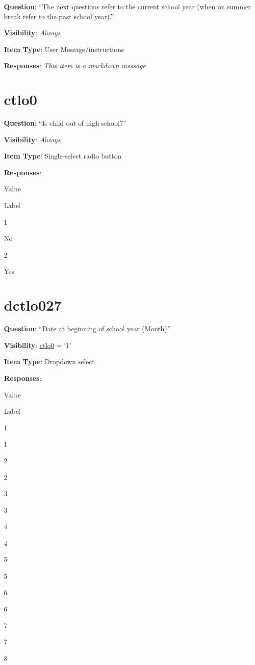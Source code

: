 \documentclass[]{book}
\begin{document}
\textbf{Question}: ``The next questions refer to the current school year (when on summer break refer to the past school year).''

\textbf{Visibility}: \emph{Always}

\textbf{Item Type}: User Message/instructions

\textbf{Responses}: \emph{This item is a markdown message}

\hypertarget{ctlo0}{%
\section{ctlo0}\label{ctlo0}}

\textbf{Question}: ``Is child out of high school?''

\textbf{Visibility}: \emph{Always}

\textbf{Item Type}: Single-select radio button

\textbf{Responses}:

Value

Label

1

No

2

Yes

\hypertarget{dctlo027}{%
\section{dctlo027}\label{dctlo027}}

\textbf{Question}: ``Date at beginning of school year (Month)''

\textbf{Visibility}: \protect\hyperlink{ctlo0}{ctlo0} = `1'

\textbf{Item Type}: Dropdown select

\textbf{Responses}:

Value

Label

1

1

2

2

3

3

4

4

5

5

6

6

7

7

8
\end{document}
